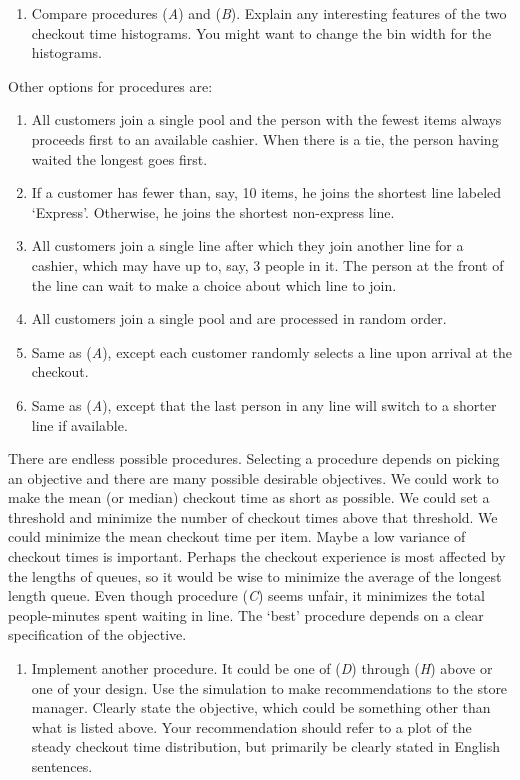 \documentclass[letter]{article}
\begin{document}
\begin{enumerate}[label=\textbf{Task \arabic*.}]
	\item Compare procedures (\textit{A}) and (\textit{B}). Explain any interesting features of the two checkout time histograms. You might want to change the bin width for the histograms.
\end{enumerate} 

Other options for procedures are:
\begin{enumerate}[label=(\textit{\Alph*}), start=3]
\item All customers join a single pool and the person with the fewest items always proceeds first to an available cashier. When there is a tie, the person having waited the longest goes first.
\item If a customer has fewer than, say, 10 items, he joins the shortest line labeled `Express'. Otherwise, he joins the shortest non-express line.
\item All customers join a single line after which they join another line for a cashier, which may have up to, say, 3 people in it. The person at the front of the line can wait to make a choice about which line to join.
\item All customers join a single pool and are processed in random order.
\item Same as (\textit{A}), except each customer randomly selects a line upon arrival at the checkout.
\item Same as (\textit{A}), except that the last person in any line will switch to a shorter line if available.
\end{enumerate}

There are endless possible procedures. Selecting a procedure depends on picking an objective and there are many possible desirable objectives. We could work to make the mean (or median) checkout time as short as possible. We could set a threshold and minimize the number of checkout times above that threshold. We could minimize the mean checkout time per item. Maybe a low variance of checkout times is important. Perhaps the checkout experience is most affected by the lengths of queues, so it would be wise to minimize the average of the longest length queue. Even though procedure (\textit{C}) seems unfair, it minimizes the total people-minutes spent waiting in line. The `best' procedure depends on a clear specification of the objective.



\begin{enumerate}[label=\textbf{Task \arabic*.}, start=2]
\item Implement another procedure. It could be one of (\textit{D}) through (\textit{H}) above or one of your design. Use the simulation to make recommendations to the store manager. Clearly state the objective, which could be something other than what is listed above. Your recommendation should refer to a plot of the steady checkout time distribution, but primarily be clearly stated in English sentences.
\end{enumerate}
\end{document}
